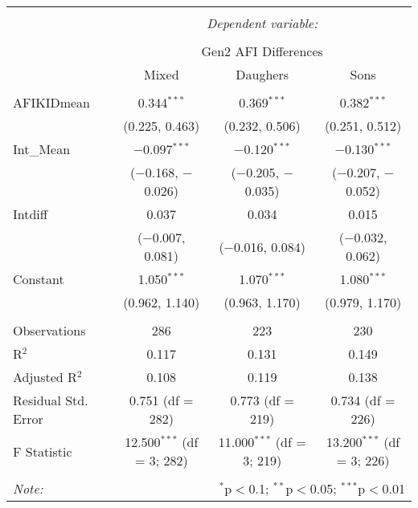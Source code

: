 
\begingroup 
\small 
\begin{tabular}{@{\extracolsep{1pt}}lccc} 
\\[-1.8ex]\hline 
\hline \\[-1.8ex] 
 & \multicolumn{3}{c}{\textit{Dependent variable:}} \\ 
\cline{2-4} 
\\[-1.8ex] & \multicolumn{3}{c}{Gen2 AFI Differences} \\ 
 & Mixed & Daughers & Sons \\ 
\hline \\[-1.8ex] 
 AFIKIDmean & 0.344$^{***}$ & 0.369$^{***}$ & 0.382$^{***}$ \\ 
  & (0.225, 0.463) & (0.232, 0.506) & (0.251, 0.512) \\ 
  Int\_Mean & $-$0.097$^{***}$ & $-$0.120$^{***}$ & $-$0.130$^{***}$ \\ 
  & ($-$0.168, $-$0.026) & ($-$0.205, $-$0.035) & ($-$0.207, $-$0.052) \\ 
  Intdiff & 0.037 & 0.034 & 0.015 \\ 
  & ($-$0.007, 0.081) & ($-$0.016, 0.084) & ($-$0.032, 0.062) \\ 
  Constant & 1.050$^{***}$ & 1.070$^{***}$ & 1.080$^{***}$ \\ 
  & (0.962, 1.140) & (0.963, 1.170) & (0.979, 1.170) \\ 
 \hline \\[-1.8ex] 
Observations & 286 & 223 & 230 \\ 
R$^{2}$ & 0.117 & 0.131 & 0.149 \\ 
Adjusted R$^{2}$ & 0.108 & 0.119 & 0.138 \\ 
Residual Std. Error & 0.751 (df = 282) & 0.773 (df = 219) & 0.734 (df = 226) \\ 
F Statistic & 12.500$^{***}$ (df = 3; 282) & 11.000$^{***}$ (df = 3; 219) & 13.200$^{***}$ (df = 3; 226) \\ 
\hline 
\hline \\[-1.8ex] 
\textit{Note:}  & \multicolumn{3}{r}{$^{*}$p$<$0.1; $^{**}$p$<$0.05; $^{***}$p$<$0.01} \\ 
\end{tabular} 
\endgroup 
